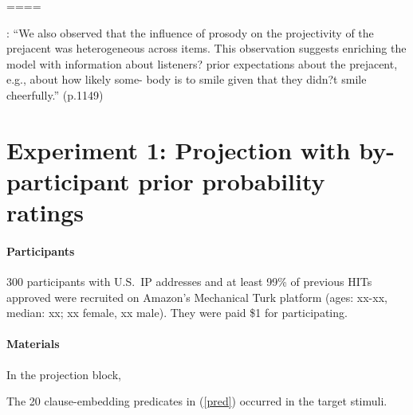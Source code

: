 \documentclass[11pt,fleqn]{article}
\newcommand{\6}{\mbox{$[\hspace*{-.6mm}[$}}
\newcommand{\9}{\mbox{$]\hspace*{-.6mm}]$}}
\begin{document}
\citealt{mahler-qp2}

====

\citealt{stevens-etal2017}: ``We also observed that the influence of prosody on the projectivity of the prejacent was heterogeneous across items. This observation suggests enriching the model with information about listeners? prior expectations about the prejacent, e.g., about how likely some- body is to smile given that they didn?t smile cheerfully.'' (p.1149)

\newpage

\section{Experiment 1: Projection with by-participant prior probability ratings}

\paragraph{Participants} 300 participants with U.S.\ IP addresses and at least 99\% of previous HITs approved were recruited on Amazon's Mechanical Turk platform (ages: xx-xx, median: xx; xx female, xx male). They were paid \$1 for participating.

\paragraph{Materials} In the projection block, 

The 20 clause-embedding predicates in (\ref{pred}) occurred in the target stimuli. 
\end{document}
